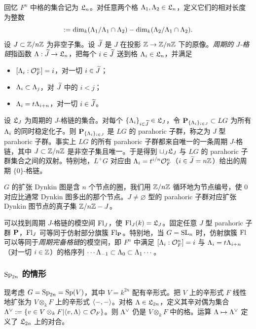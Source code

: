 回忆 $F^{n}$ 中格的集合记为 $\mathfrak{L}_{n}$。对任意两个格 $\Lambda_{1},\Lambda_{2}\in\mathfrak{L}_{n}$，定义它们的相对长度为整数
\begin{equation*}
[\L_{1}:\L_{2}]:=\dim_{k}(\L_{1}/\L_{1}\cap\L_{2})-\dim_{k}(\L_{2}/\L_{1}\cap\L_{2}).
\end{equation*}
设 $J\subset \mathbb{Z}/n\mathbb{Z}$ 为非空子集。设 $\widetilde{J}$ 是 $J$ 在投影 $\mathbb{Z}\to\mathbb{Z}/n\mathbb{Z}$ 下的原像。{\em 周期的 $J$-格链}指函数 $\Lambda:\widetilde{J}\to \mathfrak{L}_{n}$，把每个 $i\in \widetilde{J}$ 送到格 $\Lambda_{i}\in\mathfrak{L}_{n}$，并满足
\begin{itemize}
\item $[\Lambda_{i}:\mathcal{O}_{F}^{n}]=i$，对一切 $i\in \widetilde{J}$；
\item $\Lambda_{i}\subset \Lambda_{j}$，对 $\widetilde{J}$ 中的 $i<j$；
\item $\Lambda_{i}=t\Lambda_{i+n}$，对一切 $i\in \widetilde{J}$。
\end{itemize}
设 $\mathfrak{L}_{J}$ 为周期的 $J$-格链的集合。对每个 $\{\Lambda_{i}\}_{i\in \widetilde{J}}\in\mathfrak{L}_{J}$，令 $\mathbf{P}_{\{\Lambda_{i}\}_{i\in J}}\subset LG$ 为所有 $\Lambda_{i}$ 的同时稳定化子。则 $\mathbf{P}_{\{\Lambda_{i}\}_{i\in J}}$ 是 $LG$ 的 parahoric 子群，称之为 $J$ 型 parahoric 子群。事实上 $LG$ 的所有 parahoric 子群都来自唯一的一条周期 $J$-格链，其中 $J\subset \mathbb{Z}/n\mathbb{Z}$ 是非空子集且唯一。于是得到 $\sqcup_{J}\mathfrak{L}_{J}$ 与 $LG$ 的 parahoric 子群集合之间的双射。特别地，$L^{+}G$ 对应由 $\Lambda_{i}=t^{i/n}\mathcal{O}^{n}_{F}$（$i\in \widetilde{J}=n\mathbb{Z}$）给出的周期 $\{0\}$-格链。

$G$ 的扩张 Dynkin 图是含 $n$ 个节点的圈，我们用 $\mathbb{Z}/n\mathbb{Z}$ 循环地为节点编号，使 $0$ 对应比通常 Dynkin 图多出的那个节点。$J\neq\varnothing$ 型的 parahoric 子群对应扩张 Dynkin 图节点的真子集 $\mathbb{Z}/n\mathbb{Z}-J$。

可以找到周期 $J$-格链的模空间 $\textup{Fl}_{J}$，使 $\textup{Fl}_{J}(k)=\mathfrak{L}_{J}$。固定任意 $J$ 型 parahoric 子群 $\mathbf{P}$，$\textup{Fl}_{J}$ 可等同于仿射部分旗簇 $\textup{Fl}_{\mathbf{P}}$。特别地，当 $G=\textup{SL}_{n}$ 时，仿射旗簇 $\textup{Fl}$ 可以等同于{\em 周期完备格链}的模空间，即 $F^{n}$ 中满足 $[\Lambda_{i}:\mathcal{O}^{n}_{F}]=i$ 与 $\Lambda_{i}=t\Lambda_{i+n}$（对一切 $i\in\mathbb{Z}$）的格序列 $\cdots \Lambda_{-1}\subset \Lambda_{0}\subset \Lambda_{1}\cdots$。

\subsubsection{$\textup{Sp}_{2n}$ 的情形}\label{sss:Sp parahoric} 现考虑 $G=\textup{Sp}_{2n}=\textup{Sp}(V)$，其中 $V=k^{2n}$ 配有辛形式。把 $V$ 上的辛形式 $F$ 线性地扩张为 $V\otimes_{k}F$ 上的辛形式 $\langle{-,-}\rangle$。对格 $\Lambda\in \mathfrak{L}_{2n}$，定义其辛对偶为集合 $\Lambda^{\vee}:=\{v\in V\otimes_{k}F|\langle{v,\Lambda}\rangle\subset \mathcal{O}_{F}\}$。则 $\Lambda^{\vee}$ 仍是 $V\otimes_{k}F$ 中的格。运算 $\Lambda\mapsto \Lambda^{\vee}$ 定义了 $\mathfrak{L}_{2n}$ 上的对合。

